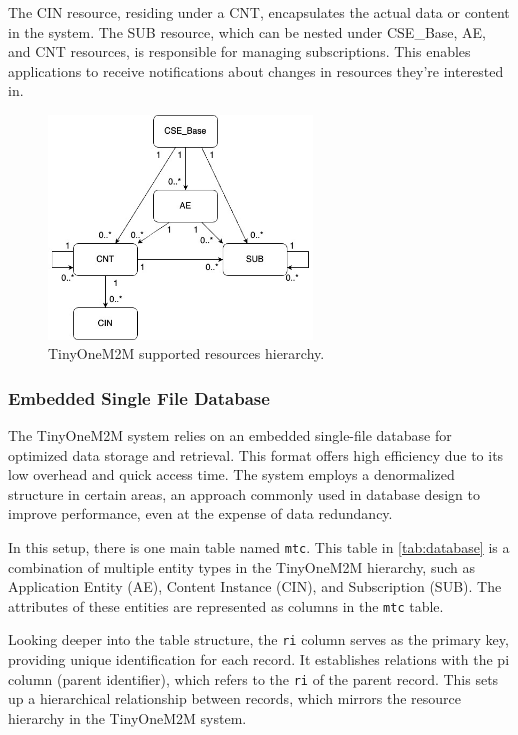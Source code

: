 \documentclass[a4paper,fleqn]{cas-dc}
\begin{document}
The CIN resource, residing under a CNT, encapsulates the actual data or content in the system. The SUB resource, which can be nested under CSE\_Base, AE, and CNT resources, is responsible for managing subscriptions. This enables applications to receive notifications about changes in resources they're interested in.

\begin{figure}[htbp]
	\centering
	\includegraphics[width=7cm]{Hierarchy}
	\caption{TinyOneM2M supported resources hierarchy.}
	\label{fig:hierarchy}
\end{figure}

\subsubsection{Embedded Single File Database}

The TinyOneM2M system relies on an embedded single-file database for optimized data storage and retrieval. This format offers high efficiency due to its low overhead and quick access time. The system employs a denormalized structure in certain areas, an approach commonly used in database design to improve performance, even at the expense of data redundancy.

In this setup, there is one main table named \texttt{mtc}. This table in \ref{tab:database} is a combination of multiple entity types in the TinyOneM2M hierarchy, such as Application Entity (AE), Content Instance (CIN), and Subscription (SUB). The attributes of these entities are represented as columns in the \texttt{mtc} table.

Looking deeper into the table structure, the \texttt{ri} column serves as the primary key, providing unique identification for each record. It establishes relations with the pi column (parent identifier), which refers to the \texttt{ri} of the parent record. This sets up a hierarchical relationship between records, which mirrors the resource hierarchy in the TinyOneM2M system.
\end{document}
